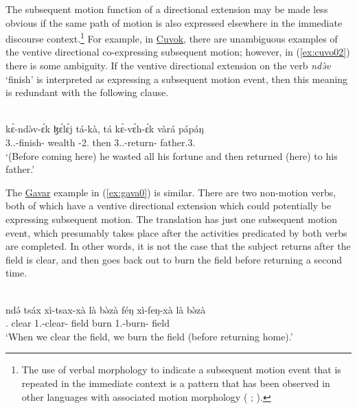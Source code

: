 The subsequent motion function of a directional extension may be made less obvious if the same path of motion is also expressed elsewhere in the immediate discourse context.\footnote{The use of verbal morphology to indicate a subsequent motion event that is repeated in the immediate context is a pattern that has been observed in other languages with associated motion morphology (\citeauthor{guillaumeIntroductionAssociatedMotion2021} \citeyear[15]{guillaumeIntroductionAssociatedMotion2021}; \citeauthor{wilkinsSemanticsPragmaticsDiachronic1991} \citeyear[251]{wilkinsSemanticsPragmaticsDiachronic1991}).} For example, in \hyperref[cuvo]{Cuvok}, there are unambiguous examples of the ventive directional co-expressing subsequent motion; however, in (\ref{ex:cuvo02}) there is some ambiguity. If the ventive directional extension on the verb \textit{ndə̀v} `finish' is interpreted as expressing a subsequent motion event, then this meaning is redundant with the following clause. 

\ea\label{ex:cuvo02}
 \\
\gll kɛ̀-ndə̀v-ɛ́k ɮɛ́lɛ̀j tá-kà, tá kɛ̀-vɛ̀h-ɛ́k vàrá pápáŋ \\
3..-finish- wealth -2. then 3..-return-  father.3. \\
\glt `(Before coming here) he wasted all his fortune and then returned (here) to his father.' 
\z

The \hyperref[gava]{Gavar} example in (\ref{ex:gava0}) is similar. There are two non-motion verbs, both of which have a ventive directional extension which could potentially be expressing subsequent motion. The translation has just one subsequent motion event, which presumably takes place after the activities predicated by both verbs are completed. In other words, it is not the case that the subject returns after the field is clear, and then goes back out to burn the field before returning a second time. 

\ea\label{ex:gava0}
 \\
\gll ndə́ tsáx xì-tsax-xà là bə̀zà féŋ xì-feŋ-xà là bə̀zà	 \\
. clear 1.-clear- field  burn 1.-burn- field 	 \\
\glt `When we clear the field, we burn the field (before returning home).'
\z 

